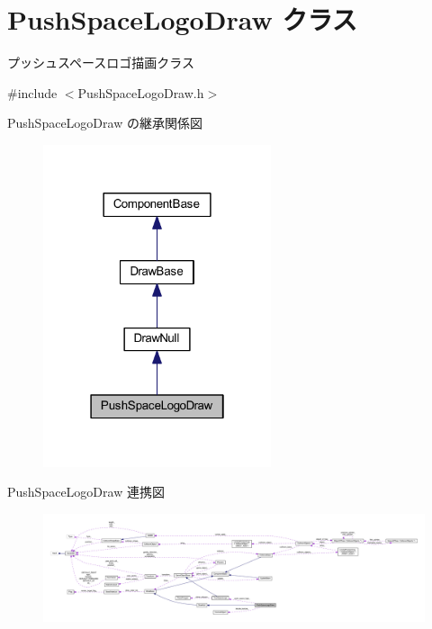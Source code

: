 \hypertarget{class_push_space_logo_draw}{}\section{Push\+Space\+Logo\+Draw クラス}
\label{class_push_space_logo_draw}


プッシュスペースロゴ描画クラス  




{\ttfamily \#include $<$Push\+Space\+Logo\+Draw.\+h$>$}



Push\+Space\+Logo\+Draw の継承関係図\nopagebreak
\begin{figure}[H]
\begin{center}
\leavevmode
\includegraphics[width=190pt]{class_push_space_logo_draw__inherit__graph}
\end{center}
\end{figure}


Push\+Space\+Logo\+Draw 連携図\nopagebreak
\begin{figure}[H]
\begin{center}
\leavevmode
\includegraphics[width=350pt]{class_push_space_logo_draw__coll__graph}
\end{center}
\end{figure}
